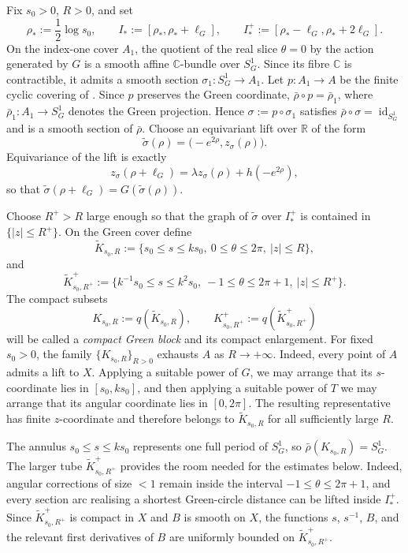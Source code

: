 \documentclass[12pt]{amsart}
\numberwithin{equation}{section}
\theoremstyle{remark}
\theoremstyle{definition}
\begin{document}
\label{def:compact-green-block}
Fix $s_0>0$, $R>0$, and set
$$
\rho_*:=\frac12\log s_0,
\qquad
I_*:=[\rho_*,\rho_*+\ell_G],
\qquad
I_*^+:=[\rho_*-\ell_G,\rho_*+2\ell_G].
$$
On the index-one cover $A_1$, the quotient of the real slice $\theta=0$ by the action generated by $G$ is a smooth affine $\mathbb C$-bundle over $S^1_G$. Since its fibre $\mathbb C$ is contractible, it admits a smooth section $\sigma_1:S^1_G\to A_1$. Let $p:A_1\to A$ be the finite cyclic covering of . Since $p$ preserves the Green coordinate, $\bar\rho\circ p=\bar\rho_1$, where $\bar\rho_1:A_1\to S^1_G$ denotes the Green projection. Hence $\sigma:=p\circ\sigma_1$ satisfies $\bar\rho\circ\sigma=\operatorname{id}_{S^1_G}$ and is a smooth section of $\bar\rho$. Choose an equivariant lift over $\mathbb R$ of the form
$$\widetilde\sigma(\rho)=\bigl(-e^{2\rho},z_\sigma(\rho)\bigr).$$
Equivariance of the lift is exactly
\begin{equation}\label{eq:z-sigma-equivariance}
z_\sigma(\rho+\ell_G)=\lambda z_\sigma(\rho)+h(-e^{2\rho}),
\end{equation}
so that $\widetilde\sigma(\rho+\ell_G)=G(\widetilde\sigma(\rho))$.

Choose $R^+>R$ large enough so that the graph of
$\widetilde\sigma$ over $I_*^+$ is contained in $\{|z|\leq R^+\}$. On
the Green cover define
\begin{equation*}
\widetilde K_{s_0,R}
:=
\{s_0\leq s\leq ks_0,\ 0\leq\theta\leq2\pi,\ |z|\leq R\},
\end{equation*}
and
\begin{equation*}
\widetilde K^+_{s_0,R^+}
:=
\{k^{-1}s_0\leq s\leq k^2s_0,\ -1\leq\theta\leq2\pi+1,\ |z|\leq R^+\}.
\end{equation*}
The compact subsets
$$
K_{s_0,R}:=q(\widetilde K_{s_0,R}),
\qquad
K^+_{s_0,R^+}:=q(\widetilde K^+_{s_0,R^+})
$$
will be called a \emph{compact Green block} and its compact enlargement. For fixed $s_0>0$, the family $\{K_{s_0,R}\}_{R>0}$ exhausts $A$ as $R\to+\infty$. Indeed, every point of $A$ admits a lift to $X$. Applying a suitable power of $G$, we may arrange that its $s$-coordinate lies in $[s_0,ks_0]$, and then applying a suitable power of $T$ we may arrange that its angular coordinate lies in $[0,2\pi]$. The resulting representative has finite $z$-coordinate and therefore belongs to $\widetilde K_{s_0,R}$ for all sufficiently large $R$.

The annulus $s_0\leq s\leq ks_0$ represents one full period of
$S^1_G$, so $\bar\rho(K_{s_0,R})=S^1_G$. The larger tube
$\widetilde K^+_{s_0,R^+}$ provides the room needed for the estimates below.
Indeed, angular corrections of size $<1$ remain inside the interval
$-1\leq\theta\leq2\pi+1$, and every section arc realising a shortest
Green-circle distance can be lifted inside $I_*^+$. Since $\widetilde K^+_{s_0,R^+}$ is compact in $X$ and $B$ is smooth on $X$, the functions $s$, $s^{-1}$, $B$, and the relevant first derivatives of $B$ are uniformly bounded on $\widetilde K^+_{s_0,R^+}$.
\end{document}
